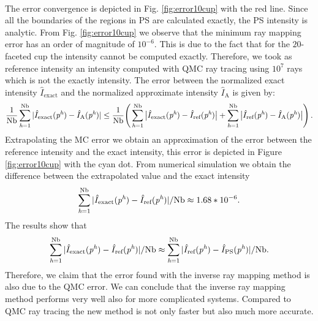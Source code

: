 \\ \indent The error convergence is depicted in Fig. \ref{fig:error10cup} with the red line.
Since all the boundaries of the regions in PS are calculated exactly, the PS intensity is analytic.
From Fig. \ref{fig:error10cup} we observe that the minimum ray mapping error has an order of magnitude of $10^{-6}$.
This is due to the fact that for the $20$-faceted cup the intensity cannot be computed exactly. 
Therefore, we took as reference intensity an intensity computed with QMC ray tracing using $10^7$ rays which is not the exactly intensity.
The error between the normalized exact intensity $\hat{I}_{\textrm{exact}}$ and the normalized approximate intensity $\hat{I}_{\textrm{A}}$ is given by:
\begin{equation}
\frac{1}{\textrm{Nb}}\sum_{\textit{h} = 1}^{\textrm{Nb}}| \hat{I}_{\textrm{exact}}(\textit{p}^{\textit{h}}) - \hat{I}_{\textrm{A}}(\textit{p}^{\textit{h}})| \leq
\frac{1}{\textrm{Nb}}\Bigg(\sum_{\textit{h} = 1}^{\textrm{Nb}}\big| \hat{I}_{\textrm{exact}}(\textit{p}^{\textit{h}}) - \hat{I}_{\textrm{ref}}(\textit{p}^{\textit{h}})\big| +
\sum_{\textit{h} = 1}^{\textrm{Nb}}\big| \hat{I}_{\textrm{ref}}(\textit{p}^{\textit{h}}) - \hat{I}_{\textrm{A}}(\textit{p}^{\textit{h}})\big|\Bigg)\,.
\end{equation}
Extrapolating the MC error we obtain an approximation of the error between the reference intensity and the exact intensity,
this error is depicted in Figure \ref{fig:error10cup} with the cyan dot.
From numerical simulation we obtain the difference between the extrapolated value and the exact intensity 
\begin{equation*}\sum_{\textit{h} = 1}^{\textrm{Nb}}| \hat{I}_{\textrm{exact}}(\textit{p}^{\textit{h}}) - \hat{I}_{\textrm{ref}}(\textit{p}^{\textit{h}})|/\textrm{Nb}\approx 1.68*10^{-6}. \end{equation*}
The results show that 
\begin{equation*}
\sum_{\textit{h} = 1}^{\textrm{Nb}}| \hat{I}_{\textrm{exact}}(\textit{p}^{\textit{h}}) - \hat{I}_{\textrm{ref}}(\textit{p}^{\textit{h}})|/\textrm{Nb}
\approx \sum_{\textit{h} = 1}^{\textrm{Nb}}|\hat{I}_{\textrm{ref}}(\textit{p}^{\textit{h}}) - \hat{I}_{\textrm{PS}}(\textit{p}^{\textit{h}})|/\textrm{Nb}.
\end{equation*}
Therefore, we claim that the error found with the inverse ray mapping method is also due to the QMC error.
We can conclude that the inverse ray mapping method performs very well also for more complicated systems.
Compared to QMC ray tracing the new method is not only faster but also much more accurate.
